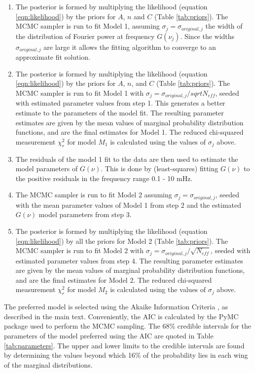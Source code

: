 \documentclass[onecolumn]{emulateapj}
\newcommand{\BF}{ }
\begin{document}
\begin{enumerate}
\item The posterior is formed by multiplying the likelihood (equation
  \ref{eqn:likelihood}) by the priors for $A$, $n$ and $C$ (Table
  \ref{tab:priors}).  The MCMC sampler is run to fit Model 1, assuming
  $\sigma_{j} = \sigma_{original, j}$ the width of the distribution of
  Fourier power at frequency $G(\nu_{j})$.  Since the widths
  $\sigma_{original, j}$ are large it allows the fitting algorithm to
  converge to an approximate fit solution.
\item The posterior is formed by multiplying the likelihood (equation
  \ref{eqn:likelihood}) by the priors for $A$, $n$, and $C$ (Table
  \ref{tab:priors}).  The MCMC sampler is run to fit Model 1 with
  $\sigma_{j} = \sigma_{original, j}/sqrt{N_{eff}}$, seeded with
  estimated parameter values from step 1.  This generates a better
  estimate to the parameters of the model fit.  The resulting
  parameter estimates are given by the mean values of marginal
  probability distribution functions, and are the final estimates for
  Model 1.  The reduced chi-squared measurement $\chi^{2}_{r}$ for
  model $M_{1}$ is calculated using the values of $\sigma_{j}$ above.
\item The residuals of the model 1 fit to the data are then used to
  estimate the model parameters of $G(\nu)$.  This is done by
  (least-squares) fitting $G(\nu)$ to the positive residuals in the
  frequency range 0.1 - 10 mHz.
\item The MCMC sampler is run to fit Model 2 assuming $\sigma_{j} =
  \sigma_{original, j}$, seeded with the mean parameter values of
  Model 1 from step 2 and the estimated $G(\nu)$ model parameters from
  step 3.
\item The posterior is formed by multiplying the likelihood (equation
  \ref{eqn:likelihood}) by all the priors for Model 2 (Table
  \ref{tab:priors}).  The MCMC sampler is run to fit Model 2 with
  $\sigma_{j} = \sigma_{original, j}/\sqrt{N_{eff}}$, seeded with
  estimated parameter values from step 4.  The resulting parameter
  estimates are given by the mean values of marginal probability
  distribution functions, and are the final estimates for Model 2.
  The reduced chi-squared measurement $\chi^{2}_{r}$ for model $M_{2}$
  is calculated using the values of $\sigma_{j}$ above.
\end{enumerate}
{\BF The preferred model is selected using the Akaike Information
  Criteria \citep{2007MNRAS.377L..74L}, as described in the main
  text.}  Conveniently, the AIC is calculated by the PyMC package used
to perform the MCMC sampling.  The 68\% credible intervals for the
{\BF parameters of the model preferred using the AIC} are quoted in
Table \ref{tab:parameters}.  The upper and lower limits to the
credible intervals are found by determining the values beyond which
16\% of the probability lies in each wing of the marginal
distributions.
\end{document}
